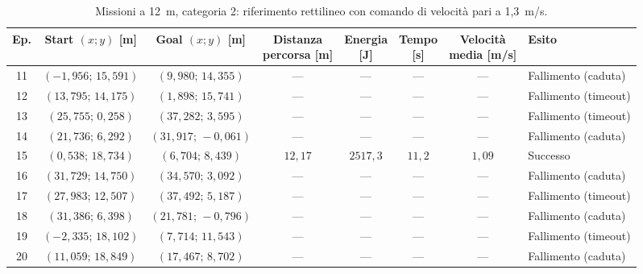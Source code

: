 \begin{table}[H]
\centering
\caption{Missioni a 12~m, categoria 2: riferimento rettilineo con comando di velocità pari a 1,3~m/s.}
\label{tab:straight-line-1-3-12m-cat2}
\begingroup
\fontsize{9}{11}\selectfont
\setlength{\tabcolsep}{2.5pt}
\renewcommand{\arraystretch}{1.2}
\begin{tabular}{@{}c cc cccc l@{}}
\toprule
Ep. & \shortstack{Start $(x;y)$\\{}[m]} & \shortstack{Goal $(x;y)$\\{}[m]} & \shortstack{Distanza\\percorsa [m]} & \shortstack{Energia\\{}[J]} & \shortstack{Tempo\\{}[s]} & \shortstack{Velocità\\media [m/s]} & Esito \\
\midrule
11 & $(-1{,}956;\,15{,}591)$ & $(9{,}980;\,14{,}355)$ & --- & --- & --- & --- & Fallimento (caduta) \\
12 & $(13{,}795;\,14{,}175)$ & $(1{,}898;\,15{,}741)$ & --- & --- & --- & --- & Fallimento (timeout) \\
13 & $(25{,}755;\,0{,}258)$ & $(37{,}282;\,3{,}595)$ & --- & --- & --- & --- & Fallimento (timeout) \\
14 & $(21{,}736;\,6{,}292)$ & $(31{,}917;\,-0{,}061)$ & --- & --- & --- & --- & Fallimento (caduta) \\
15 & $(0{,}538;\,18{,}734)$ & $(6{,}704;\,8{,}439)$ & $12{,}17$ & $2517{,}3$ & $11{,}2$ & $1{,}09$ & Successo \\
16 & $(31{,}729;\,14{,}750)$ & $(34{,}570;\,3{,}092)$ & --- & --- & --- & --- & Fallimento (caduta) \\
17 & $(27{,}983;\,12{,}507)$ & $(37{,}492;\,5{,}187)$ & --- & --- & --- & --- & Fallimento (timeout) \\
18 & $(31{,}386;\,6{,}398)$ & $(21{,}781;\,-0{,}796)$ & --- & --- & --- & --- & Fallimento (caduta) \\
19 & $(-2{,}335;\,18{,}102)$ & $(7{,}714;\,11{,}543)$ & --- & --- & --- & --- & Fallimento (timeout) \\
20 & $(11{,}059;\,18{,}849)$ & $(17{,}467;\,8{,}702)$ & --- & --- & --- & --- & Fallimento (caduta) \\
\bottomrule
\end{tabular}
\endgroup
\end{table}

